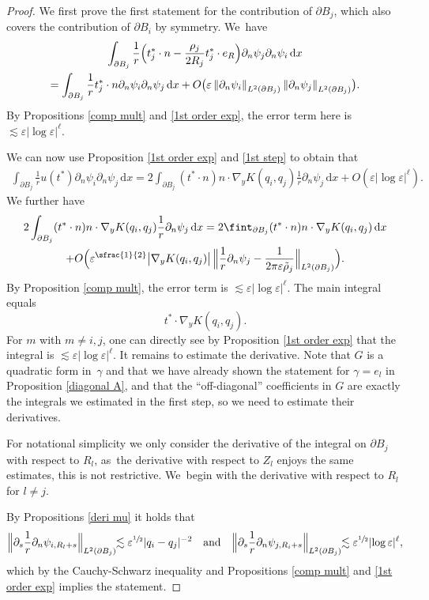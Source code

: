 \documentclass[JEP,XML,SOM,Unicode,published]{cedram}
\let\strokedint\fint
\let\epsilon\varepsilon
\theoremstyle{definition}
\newcommand\norm[1]{\left\lVert #1\right\rVert}
\newcommand\Bnorm[1]{\Bigl\lVert #1\Bigr\rVert}
\newcommand\eq{=}
\newcommand\dd{\,\mathrm{d}}
\newcommand\dx{\dd x}
\let\de\partial
\let\eps\epsilon
\begin{document}
\begin{proof}
We first prove the first statement for the contribution of $\de B_j$, which also covers the contribution of $\de B_i$ by symmetry. We~have
\begin{multline}\label{1st step}
\int_{\de B_j}\frac{1}{r}\Bigl(t_j^*\cdot n-\frac{\rho_j}{2R_j}t_j^*\cdot e_R\Bigr)\de_n\psi_j\de_n\psi_i\dx\\
\eq \int_{\de B_j} \frac{1}{r}t_j^*\cdot n\de_n \psi_i\de_n\psi_j\dx+O\bigl(\eps\norm{\de_n\psi_i}_{L^2(\de B_j)}\norm{\de_n\psi_j}_{L^2(\de B_j)}\bigr).
\end{multline}
By Propositions \ref{comp mult} and \ref{1st order exp}, the error term here is $\lesssim \eps|{\log\eps}|^\ell$.

We can now use Proposition \ref{1st order exp} and \eqref{1st step} to obtain that
\begin{align*}
\int_{\de B_j}\frac{1}{r}u(t^*)\de_n\psi_i\de_n\psi_j\dx\eq 2\int_{\de B_j}(t^*\cdot n)n\cdot\nabla_yK(q_i,q_j)\frac{1}{r}\de_n\psi_j\dx+O\left(\eps|{\log\eps}|^\ell\right).
\end{align*}
We further have
\begin{multline*}
2\int_{\de B_j}(t^*\cdot n)n\cdot\nabla_yK(q_i,q_j)\frac{1}{r}\de_n\psi_j\dx\eq2\strokedint_{\de B_j} (t^*\cdot n)n\cdot\nabla_yK(q_i,q_j)\dx\\
+O\Bigl(\eps^{\sfrac{1}{2}}\bigl|\nabla_yK(q_i,q_j)\bigr|\,\Bnorm{\frac{1}{r}\de_n\psi_j-\frac{1}{2\pi\eps\tilde{\rho}_j}}_{L^2(\de B_j)}\Bigr).
\end{multline*}
By Proposition \ref{comp mult}, the error term is $\lesssim \eps|{\log\eps}|^\ell$. The main integral equals
\[
t^*\cdot\nabla_yK(q_i,q_j).
\]
For $m$ with $m\neq i,j$, one can directly see by Proposition \ref{1st order exp} that the integral is $\lesssim \eps|{\log\eps}|^\ell$.
It remains to estimate the derivative. Note that $G$ is a quadratic form in~$\gamma$ and that we have already shown the statement for $\gamma=e_l$ in Proposition \ref{diagonal A}, and that the ``off-diagonal'' coefficients in $G$ are exactly the integrals we estimated in the first step, so we need to estimate their derivatives.

For notational simplicity we only consider the derivative of the integral on $\de B_j$ with respect to $R_l$, as~the derivative with respect to $Z_l$ enjoys the same estimates, this is not restrictive. We~begin with the derivative with respect to $R_l$ for $l\neq j$.

By Propositions \ref{deri mu} it holds that
\begin{align*}
\Bnorm{\de_s\frac{1}{r}\de_n\psi_{i,R_l+s}}_{L^2(\de B_j)}\!\!\lesssim \eps^{\sfrac{1}{2}}|q_i-q_j|^{-2}\quad\text{and}\quad \Bnorm{\de_s\frac{1}{r}\de_n\psi_{j,R_i+s}}_{L^2(\de B_j)}\!\!\lesssim \eps^{\sfrac{1}{2}}|{\log\eps}|^\ell,
\end{align*}
which by the Cauchy-Schwarz inequality and Propositions \ref{comp mult} and \ref{1st order exp} implies the statement.


\end{proof}
\end{document}
